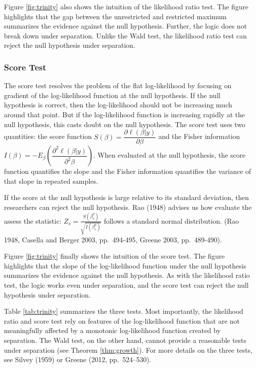\documentclass[
]{article}
\begin{document}
Figure \ref{fig:trinity} also shows the intuition of the likelihood
ratio test. The figure highlights that the gap between the unrestricted
and restricted maximum summarizes the evidence against the null
hypothesis. Further, the logic does not break down under separation.
Unlike the Wald test, the likelihood ratio test can reject the null
hypothesis under separation.

\hypertarget{score-test}{%
\subsubsection{Score Test}\label{score-test}}

The score test resolves the problem of the flat log-likelihood by
focusing on gradient of the log-likelihood function at the null
hypothesis. If the null hypothesis is correct, then the log-likelihood
should not be increasing much around that point. But if the
log-likelihood function is increasing rapidly at the null hypothesis,
this casts doubt on the null hypothesis. The score test uses two
quantities: the score function
\(S(\beta) = \dfrac{\partial \ell(\beta | y)}{\partial \beta}\) and the
Fisher information
\(I(\beta) = -E_\beta \left( \dfrac{\partial^2 \ell(\beta | y)}{\partial^2 \beta} \right)\).
When evaluated at the null hypothesis, the score function quantifies the
slope and the Fisher information quantifies the variance of that slope
in repeated samples.

If the score at the null hypothesis is large relative to its standard
deviation, then researchers can reject the null hypothesis. Rao (1948)
advises us how evaluate the assess the statistic:
\(Z_s = \frac{S(\beta^0_s)}{\sqrt{I(\beta^0_s)}}\) follows a standard
normal distribution. (Rao 1948, Casella and Berger 2003, pp.~494-495,
Greene 2003, pp.~489-490).

Figure \ref{fig:trinity} finally shows the intuition of the score test.
The figure highlights that the slope of the log-likelihood function
under the null hypothesis summarizes the evidence against the null
hypothesis. As with the likelihood ratio test, the logic works even
under separation, and the score test can reject the null hypothesis
under separation.

Table \ref{tab:trinity} summarizes the three tests. Most importantly,
the likelihood ratio and score test rely on features of the
log-likelihood function that are not meaningfully affected by a
monotonic log-likelihood function created by separation. The Wald test,
on the other hand, cannot provide a reasonable tests under separation
(see Theorem \ref{thm:growth}). For more details on the three tests, see
Silvey (1959) or Greene (2012, pp.~524--530).
\end{document}
